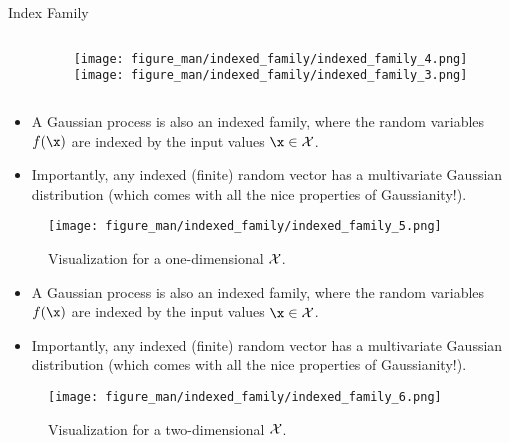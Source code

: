 \begin{frame}[c,allowframebreaks]{Index Family}
\begin{columns}[T]
\begin{column}{.5\textwidth}
\end{column}
\begin{column}{.35\textwidth}
\texttt{[image: figure\_man/indexed\_family/indexed\_family\_4.png]}\\
\texttt{[image: figure\_man/indexed\_family/indexed\_family\_3.png]}
\end{column}
\end{columns}



\begin{itemize}
  \item A Gaussian process is also an indexed family, where the random variables $f(\x)$ are indexed by the input values $\x\in\Xspace$. 
  \item Importantly, any indexed (finite) random vector has a multivariate Gaussian distribution (which comes with all the nice properties of Gaussianity!). 
\end{itemize}

\lz

\begin{figure}
\texttt{[image: figure\_man/indexed\_family/indexed\_family\_5.png]}\par
\begin{footnotesize}
Visualization for a one-dimensional $\mathcal{X}$.
\end{footnotesize}
\end{figure}


\framebreak

\begin{itemize}
  \item A Gaussian process is also an indexed family, where the random variables $f(\x)$ are indexed by the input values $\x\in\Xspace$. 
  \item Importantly, any indexed (finite) random vector has a multivariate Gaussian distribution (which comes with all the nice properties of Gaussianity!). 
\end{itemize}

\lz

\begin{figure}
\texttt{[image: figure\_man/indexed\_family/indexed\_family\_6.png]}\par
\begin{footnotesize}
Visualization for a two-dimensional $\mathcal{X}$.
\end{footnotesize}
\end{figure}


\end{frame}
